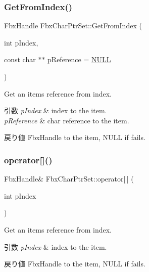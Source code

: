 \subsubsection{\texorpdfstring{Get\+From\+Index()}{GetFromIndex()}}
{\footnotesize\ttfamily Fbx\+Handle Fbx\+Char\+Ptr\+Set\+::\+Get\+From\+Index (\begin{DoxyParamCaption}\item[{int}]{p\+Index,  }\item[{const char $\ast$$\ast$}]{p\+Reference = {\ttfamily \hyperlink{fbxarch_8h_a070d2ce7b6bb7e5c05602aa8c308d0c4}{N\+U\+LL}} }\end{DoxyParamCaption})}

Get an item\textquotesingle{}s reference from index. 
\begin{DoxyParams}{引数}
{\em p\+Index} & index to the item. \\
\hline
{\em p\+Reference} & char reference to the item. \\
\hline
\end{DoxyParams}
\begin{DoxyReturn}{戻り値}
Fbx\+Handle to the item, N\+U\+LL if fails. 
\end{DoxyReturn}
\mbox{\label{class_fbx_char_ptr_set_a925f5012e7dd515e1d3c44584c97101d}} 
\subsubsection{\texorpdfstring{operator[]()}{operator[]()}}
{\footnotesize\ttfamily Fbx\+Handle\& Fbx\+Char\+Ptr\+Set\+::operator\mbox{[}$\,$\mbox{]} (\begin{DoxyParamCaption}\item[{int}]{p\+Index }\end{DoxyParamCaption})}

Get an item\textquotesingle{}s reference from index. 
\begin{DoxyParams}{引数}
{\em p\+Index} & index to the item. \\
\hline
\end{DoxyParams}
\begin{DoxyReturn}{戻り値}
Fbx\+Handle to the item, N\+U\+LL if fails. 
\end{DoxyReturn}
\mbox{\label{class_fbx_char_ptr_set_afb7850c77043dd57c0fae1743ca01d29}} 
